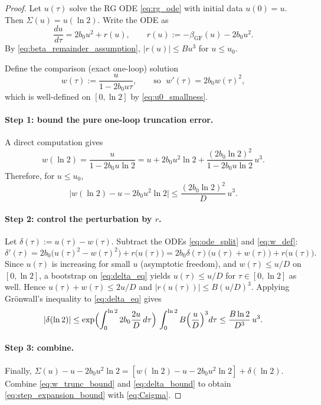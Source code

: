 \begin{proof}
Let $u(\tau)$ solve the RG ODE \eqref{eq:rg_ode} with initial data $u(0)=u$.
Then $\Sigma(u)=u(\ln 2)$.
Write the ODE as
\begin{equation}
\label{eq:ode_split}
\frac{du}{d\tau} = 2b_0u^2 + r(u),\qquad r(u):= -\beta_{\mathrm{GF}}(u)-2b_0u^2.
\end{equation}
By \eqref{eq:beta_remainder_assumption}, $|r(u)|\le Bu^3$ for $u\le u_0$.

Define the comparison (exact one-loop) solution
\begin{equation}
\label{eq:w_def}
 w(\tau):=\frac{u}{1-2b_0u\tau},\qquad \text{so }\; w'(\tau)=2b_0 w(\tau)^2,
\end{equation}
which is well-defined on $[0,\ln 2]$ by \eqref{eq:u0_smallness}.

\paragraph{Step 1: bound the pure one-loop truncation error.}
A direct computation gives
\[
 w(\ln 2)=\frac{u}{1-2b_0u\ln 2}=u+2b_0u^2\ln 2+\frac{(2b_0\ln 2)^2}{1-2b_0u\ln 2}\,u^3.
\]
Therefore, for $u\le u_0$,
\begin{equation}
\label{eq:w_trunc_bound}
\bigl|w(\ln 2)-u-2b_0u^2\ln 2\bigr|\le \frac{(2b_0\ln 2)^2}{D}\,u^3.
\end{equation}

\paragraph{Step 2: control the perturbation by $r$.}
Let $\delta(\tau):=u(\tau)-w(\tau)$.
Subtract the ODEs \eqref{eq:ode_split} and \eqref{eq:w_def}:
\begin{equation}
\label{eq:delta_eq}
\delta'(\tau)=2b_0\bigl(u(\tau)^2-w(\tau)^2\bigr)+r\bigl(u(\tau)\bigr)=2b_0\delta(\tau)\bigl(u(\tau)+w(\tau)\bigr)+r\bigl(u(\tau)\bigr).
\end{equation}
Since $u(\tau)$ is increasing for small $u$ (asymptotic freedom), and $w(\tau)\le u/D$ on $[0,\ln 2]$, a bootstrap on \eqref{eq:delta_eq} yields
$u(\tau)\le u/D$ for $\tau\in[0,\ln 2]$ as well.
Hence $u(\tau)+w(\tau)\le 2u/D$ and $|r(u(\tau))|\le B(u/D)^3$.
Applying Gr\"onwall's inequality to \eqref{eq:delta_eq} gives
\begin{equation}
\label{eq:delta_bound}
|\delta(\ln 2)|\le \exp\Bigl(\int_0^{\ln 2} 2b_0\frac{2u}{D}\,d\tau\Bigr)\,\int_0^{\ln 2} B\Bigl(\frac{u}{D}\Bigr)^3 d\tau
\le \frac{B\ln 2}{D^3}\,u^3.
\end{equation}

\paragraph{Step 3: combine.}
Finally,
$\Sigma(u)-u-2b_0u^2\ln 2 = [w(\ln 2)-u-2b_0u^2\ln 2] + \delta(\ln 2)$.
Combine \eqref{eq:w_trunc_bound} and \eqref{eq:delta_bound} to obtain \eqref{eq:step_expansion_bound} with \eqref{eq:Csigma}.
\end{proof}

